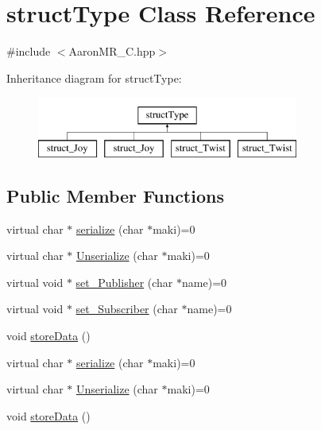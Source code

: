 \hypertarget{classstructType}{
\section{structType Class Reference}
\label{classstructType}
}


{\ttfamily \#include $<$AaronMR\_\-C.hpp$>$}

Inheritance diagram for structType:\begin{figure}[H]
\begin{center}
\leavevmode
\includegraphics[height=2cm]{classstructType}
\end{center}
\end{figure}
\subsection*{Public Member Functions}
\begin{DoxyCompactItemize}
\item 
virtual char $\ast$ \hyperlink{classstructType_a515f5e08e2c7c054145d5dcce4e8adb1}{serialize} (char $\ast$maki)=0
\item 
virtual char $\ast$ \hyperlink{classstructType_ac89681a3336b2fc76e65435238241db2}{Unserialize} (char $\ast$maki)=0
\item 
virtual void $\ast$ \hyperlink{classstructType_aa017fe323160d25667ed838023db944d}{set\_\-Publisher} (char $\ast$name)=0
\item 
virtual void $\ast$ \hyperlink{classstructType_a2f5adefc54e1e0f5a9100ab78e3c3749}{set\_\-Subscriber} (char $\ast$name)=0
\item 
void \hyperlink{classstructType_aeeef09e0813fb532bd84bbd8010bdd94}{storeData} ()
\item 
virtual char $\ast$ \hyperlink{classstructType_a515f5e08e2c7c054145d5dcce4e8adb1}{serialize} (char $\ast$maki)=0
\item 
virtual char $\ast$ \hyperlink{classstructType_ac89681a3336b2fc76e65435238241db2}{Unserialize} (char $\ast$maki)=0
\item 
void \hyperlink{classstructType_aeeef09e0813fb532bd84bbd8010bdd94}{storeData} ()
\end{DoxyCompactItemize}


